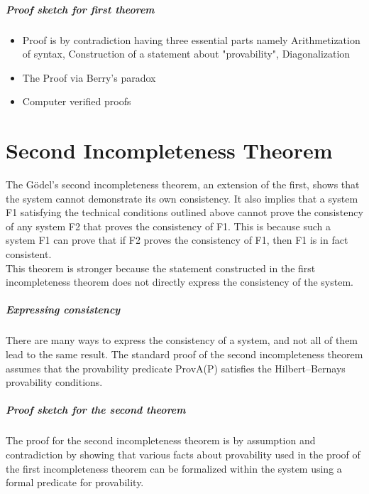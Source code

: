 \documentclass[10pt,a4paper,twoside]{article}
\begin{document}
\subparagraph{Proof sketch for first theorem}
\begin{itemize}
\item Proof is by contradiction having three essential parts namely Arithmetization of syntax, Construction of a statement about "provability", Diagonalization
\item The Proof via Berry's paradox
\item Computer verified proofs
\end{itemize}

\section{Second Incompleteness Theorem}
The Gödel's second incompleteness theorem, an extension of the first, shows that the system cannot demonstrate its own consistency. It also implies that a system F1 satisfying the technical conditions outlined above cannot prove the consistency of any system F2 that proves the consistency of F1. This is because such a system F1 can prove that if F2 proves the consistency of F1, then F1 is in fact consistent.\\
This theorem is stronger because the statement constructed in the first incompleteness theorem does not directly express the consistency of the system. 

\subparagraph{Expressing consistency}
There are many ways to express the consistency of a system, and not all of them lead to the same result. The standard proof of the second incompleteness theorem assumes that the provability predicate ProvA(P) satisfies the Hilbert–Bernays provability conditions.


\subparagraph{Proof sketch for the second theorem}
The proof for the second incompleteness theorem is by assumption and contradiction by showing that various facts about provability used in the proof of the first incompleteness theorem can be formalized within the system using a formal predicate for provability.
\end{document}
